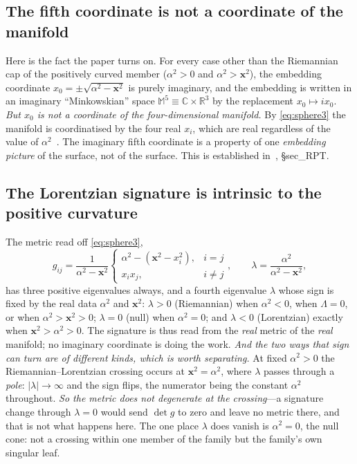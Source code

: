 \documentclass[11pt,a4paper]{article}
\theoremstyle{definition}
\begin{document}
\subsection{The fifth coordinate is not a coordinate of the manifold}

Here is the fact the paper turns on. For every case other than the
Riemannian cap of the positively curved member ($\alpha^2>0$ and $\alpha^2>\mathbf{x}^2$), the embedding
coordinate $x_0=\pm\sqrt{\alpha^2-\mathbf{x}^2}$ is purely imaginary, and
the embedding is written in an imaginary ``Minkowskian'' space
$\mathbb{M}^5\equiv\mathbb{C}\times\mathbb{R}^3$ by the replacement
$x_0\mapsto ix_0$. \emph{But $x_0$ is not a coordinate of the
four-dimensional manifold.} By \eqref{eq:sphere3} the manifold is
coordinatised by the four real $x_i$, which are real regardless of the
value of $\alpha^2$~\cite[\S following Eq.~(sphere3)]{JanzenThesis}. The
imaginary fifth coordinate is a property of one \emph{embedding picture} of
the surface, not of the surface. This is established in~\cite{JanzenThesis}, \S sec\_RPT.

\subsection{The Lorentzian signature is intrinsic to the positive
curvature}

The metric read off \eqref{eq:sphere3},
\begin{equation}
g_{ij}=\frac{1}{\alpha^2-\mathbf{x}^2}
\begin{cases}\alpha^2-(\mathbf{x}^2-x_i^2), & i=j\\ x_i x_j, & i\ne j\end{cases},
\qquad
\lambda=\frac{\alpha^2}{\alpha^2-\mathbf{x}^2},\label{eq:eigen}
\end{equation}
has three positive eigenvalues always, and a fourth eigenvalue $\lambda$
whose sign is fixed by the real data $\alpha^2$ and $\mathbf{x}^2$:
$\lambda>0$ (Riemannian) when $\alpha^2<0$, when $\Lambda=0$, or when
$\alpha^2>\mathbf{x}^2>0$; $\lambda=0$ (null) when $\alpha^2=0$; and
$\lambda<0$ (Lorentzian) exactly when $\mathbf{x}^2>\alpha^2>0$. The
signature is thus read from the \emph{real} metric of the \emph{real}
manifold; no imaginary coordinate is doing the work. \emph{And the two ways that sign can turn are of
different kinds, which is worth separating.} At fixed $\alpha^{2}>0$ the Riemannian--Lorentzian crossing
occurs at $\mathbf{x}^{2}=\alpha^{2}$, where $\lambda$ passes through a \emph{pole}: $|\lambda|\to\infty$
and the sign flips, the numerator being the constant $\alpha^{2}$ throughout. \emph{So the metric does not
degenerate at the crossing}---a signature change through $\lambda=0$ would send $\det g$ to zero and leave
no metric there, and that is not what happens here. The one place $\lambda$ does vanish is $\alpha^{2}=0$,
the null cone: not a crossing within one member of the family but the family's own singular
leaf.
\end{document}
